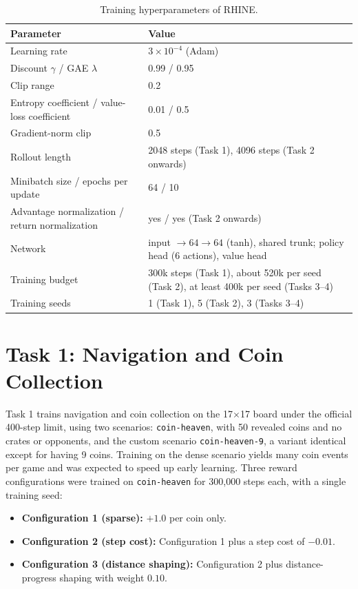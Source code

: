 \documentclass[11pt,a4paper]{report}
\begin{document}
	\begin{table}[htbp]
		\centering
		\small
		\begin{tabular}{lp{7.5cm}}
			\toprule
			Parameter & Value \\
			\midrule
			Learning rate & $3\times10^{-4}$ (Adam) \\
			Discount $\gamma$ / GAE $\lambda$ & 0.99 / 0.95 \\
			Clip range & 0.2 \\
			Entropy coefficient / value-loss coefficient & 0.01 / 0.5 \\
			Gradient-norm clip & 0.5 \\
			Rollout length & 2048 steps (Task 1), 4096 steps (Task 2 onwards) \\
			Minibatch size / epochs per update & 64 / 10 \\
			Advantage normalization / return normalization & yes / yes (Task 2 onwards) \\
			Network & input $\to 64 \to 64$ (tanh), shared trunk; policy head (6 actions), value head \\
			Training budget & 300k steps (Task 1), about 520k per seed (Task 2), at least 400k per seed (Tasks 3--4) \\
			Training seeds & 1 (Task 1), 5 (Task 2), 3 (Tasks 3--4) \\
			\bottomrule
		\end{tabular}
		\caption{Training hyperparameters of RHINE.}
		\label{tab:rhine_hyperparameters}
	\end{table}
	
	\section{Task 1: Navigation and Coin Collection}
	\label{subsec:rhine_training_task1}
	
	Task 1 trains navigation and coin collection on the 17$\times$17 board under the official 400-step limit, using two scenarios: \texttt{coin-heaven}, with 50 revealed coins and no crates or opponents, and the custom scenario \texttt{coin-heaven-9}, a variant identical except for having 9 coins. Training on the dense scenario yields many coin events per game and was expected to speed up early learning. Three reward configurations were trained on \texttt{coin-heaven} for 300{,}000 steps each, with a single training seed:
	
	\begin{itemize}[noitemsep]
		\item \textbf{Configuration 1 (sparse):} $+1.0$ per coin only.
		\item \textbf{Configuration 2 (step cost):} Configuration 1 plus a step cost of $-0.01$.
		\item \textbf{Configuration 3 (distance shaping):} Configuration 2 plus distance-progress shaping with weight $0.10$.
	\end{itemize}
	
\end{document}
